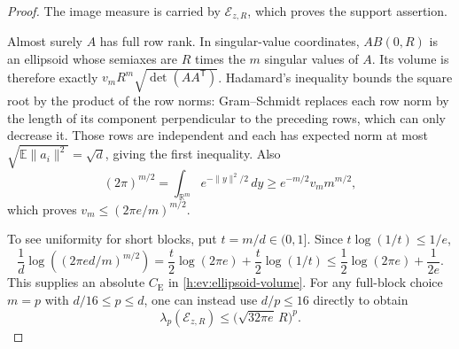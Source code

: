 \begin{proof}
The image measure is carried by \(\mathcal E_{z,R}\), which proves
the support assertion.

Almost surely \(A\) has full row rank.  In singular-value coordinates,
\(A B(0,R)\) is an ellipsoid whose semiaxes are \(R\) times the
\(m\) singular values of \(A\).  Its volume is therefore exactly
\(v_mR^m\sqrt{\det(AA^{\mathsf T})}\).  Hadamard's inequality bounds
the square root by the product of the row norms: Gram--Schmidt replaces
each row norm by the length of its component perpendicular to the
preceding rows, which can only decrease it.  Those rows are
independent and each has expected norm at most
\(\sqrt{\mathbb E\|a_i\|^2}=\sqrt d\), giving the first inequality.
Also
\[
 (2\pi)^{m/2}
 =\int_{\mathbb R^m}e^{-\|y\|^2/2}\,dy
 \ge e^{-m/2}v_m m^{m/2},
\]
which proves \(v_m\le(2\pi e/m)^{m/2}\).

To see uniformity for short blocks, put \(t=m/d\in(0,1]\).  Since
\(t\log(1/t)\le1/e\),
\[
 \frac1d\log\!\left((2\pi e d/m)^{m/2}\right)
 =\frac t2\log(2\pi e)+\frac t2\log(1/t)
 \le\frac12\log(2\pi e)+\frac1{2e}.
\]
This supplies an absolute \(C_{\mathrm E}\) in
\eqref{h:ev:ellipsoid-volume}.  For any full-block choice
\(m=p\) with \(d/16\le p\le d\), one can instead use \(d/p\le16\)
directly to obtain
\begin{equation}\label{h:ev:full-ellipsoid}
 \lambda_p(\mathcal E_{z,R})
 \le \bigl(\sqrt{32\pi e}\,R\bigr)^p.
\end{equation}
\end{proof}
